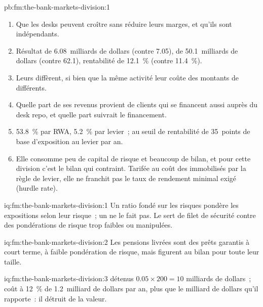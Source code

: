 \begin{solution}{pb:fm:the-bank-markets-division:1}
\begin{enumerate}
\item Que les desks peuvent croître sans réduire leurs marges, et qu'ils sont indépendants.
\item Résultat de 6.08~milliards de dollars (contre 7.05),  de 50.1~milliards de dollars (contre 62.1), rentabilité de 12.1~\% (contre 11.4~\%).
\item Leurs  diffèrent, si bien que la même activité leur coûte des montants de  différents.
\item Quelle part de ses revenus provient de clients qui se financent aussi auprès du desk repo, et quelle part suivrait le financement.
\item 53.8~\% par RWA, 5.2~\% par levier~;  au seuil de rentabilité de 35~points de base d'exposition au levier par an.
\item Elle consomme peu de capital de risque et beaucoup de bilan, et pour cette division c'est le bilan qui contraint. Tarifée au coût des
 immobilisés par la règle de levier, elle ne franchit pas le taux de rendement minimal exigé (hurdle rate).
\end{enumerate}
\end{solution}

\begin{solution}{iq:fm:the-bank-markets-division:1}
Un ratio fondé sur les risques pondère les expositions selon leur risque~; un  ne le fait pas. Le  sert de filet de sécurité contre des pondérations de risque trop faibles ou
manipulées.
\end{solution}

\begin{solution}{iq:fm:the-bank-markets-division:2}
Les pensions livrées sont des prêts garantis à court terme, à faible pondération de risque, mais figurent au bilan pour toute leur taille.
\end{solution}

\begin{solution}{iq:fm:the-bank-markets-division:3}
 détenus $0.05\times200=10$ milliards de dollars~; coût à 12~\% de 1.2~milliard de dollars par an, plus que le milliard de dollars qu'il rapporte~: il détruit de la valeur.
\end{solution}

